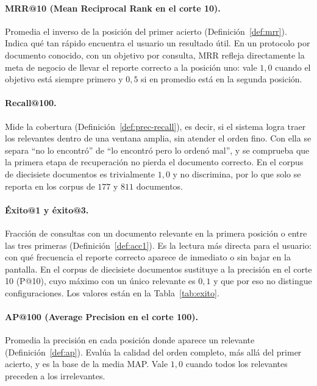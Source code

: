 \documentclass[11pt,letterpaper]{article}
\numberwithin{equation}{section}
\begin{document}
\paragraph{MRR@10 (Mean Reciprocal Rank en el corte 10).} Promedia el inverso de la posición del primer acierto (Definición~\ref{def:mrr}). Indica qué tan rápido encuentra el usuario un resultado útil. En un protocolo por documento conocido, con un objetivo por consulta, MRR refleja directamente la meta de negocio de llevar el reporte correcto a la posición uno: vale $1{,}0$ cuando el objetivo está siempre primero y $0{,}5$ si en promedio está en la segunda posición.

\paragraph{Recall@100.} Mide la cobertura (Definición~\ref{def:prec-recall}), es decir, si el sistema logra traer los relevantes dentro de una ventana amplia, sin atender el orden fino. Con ella se separa ``no lo encontró'' de ``lo encontró pero lo ordenó mal'', y se comprueba que la primera etapa de recuperación no pierda el documento correcto. En el corpus de diecisiete documentos es trivialmente $1{,}0$ y no discrimina, por lo que solo se reporta en los corpus de $177$ y $811$ documentos.

\paragraph{Éxito@1 y éxito@3.} Fracción de consultas con un documento relevante en la primera posición o entre las tres primeras (Definición~\ref{def:acc1}). Es la lectura más directa para el usuario: con qué frecuencia el reporte correcto aparece de inmediato o sin bajar en la pantalla. En el corpus de diecisiete documentos sustituye a la precisión en el corte 10 (P@10), cuyo máximo con un único relevante es $0{,}1$ y que por eso no distingue configuraciones. Los valores están en la Tabla~\ref{tab:exito}.

\paragraph{AP@100 (Average Precision en el corte 100).} Promedia la precisión en cada posición donde aparece un relevante (Definición~\ref{def:ap}). Evalúa la calidad del orden completo, más allá del primer acierto, y es la base de la media MAP. Vale $1{,}0$ cuando todos los relevantes preceden a los irrelevantes.
\end{document}
